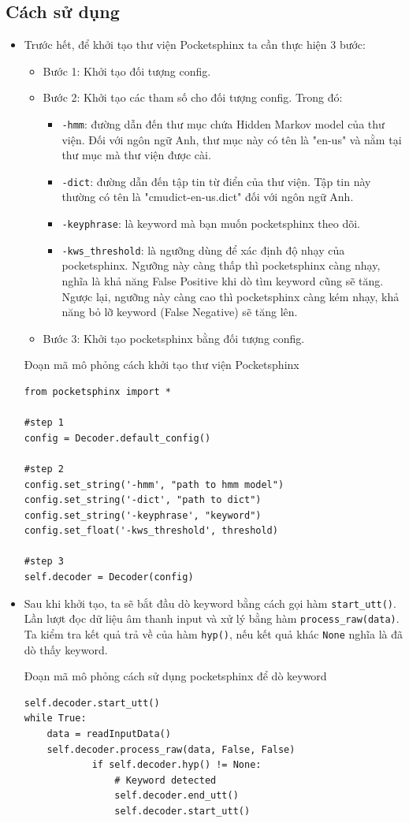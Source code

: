 \subsection{Cách sử dụng}
\begin{itemize}
\item Trước hết, để khởi tạo thư viện Pocketsphinx ta cần thực hiện 3 bước:
\begin{itemize}
\item Bước 1: Khởi tạo đối tượng config.
\item Bước 2: Khởi tạo các tham số cho đối tượng config. Trong đó:
\begin{itemize}
\item \lstinline{-hmm}: đường dẫn đến thư mục chứa Hidden Markov model của thư viện. Đối với ngôn ngữ Anh, thư mục này có tên là "en-us" và nằm tại thư mục mà thư viện được cài.
\item \lstinline{-dict}: đường dẫn đến tập tin từ điển của thư viện. Tập tin này thường có tên là "cmudict-en-us.dict" đối với ngôn ngữ Anh.
\item \lstinline{-keyphrase}: là keyword mà bạn muốn pocketsphinx theo dõi.
\item \lstinline{-kws_threshold}: là ngưỡng dùng để xác định độ nhạy của pocketsphinx. Ngưỡng này càng thấp thì pocketsphinx càng nhạy, nghĩa là khả năng False Positive khi dò tìm keyword cũng sẽ tăng. Ngược lại, ngưỡng này càng cao thì pocketsphinx càng kém nhạy, khả năng bỏ lỡ keyword (False Negative) sẽ tăng lên.
\end{itemize}
\item Bước 3: Khởi tạo pocketsphinx bằng đối tượng config.
\end{itemize}

Đoạn mã mô phỏng cách khởi tạo thư viện Pocketsphinx
\begin{lstlisting}
from pocketsphinx import *

#step 1
config = Decoder.default_config()

#step 2
config.set_string('-hmm', "path to hmm model")
config.set_string('-dict', "path to dict")
config.set_string('-keyphrase', "keyword")
config.set_float('-kws_threshold', threshold)

#step 3
self.decoder = Decoder(config)
\end{lstlisting}

\item Sau khi khởi tạo, ta sẽ bắt đầu dò keyword bằng cách gọi hàm \lstinline{start_utt()}. Lần lượt đọc dữ liệu âm thanh input và xử lý bằng hàm \lstinline{process_raw(data)}. Ta kiểm tra kết quả trả về của hàm \lstinline{hyp()}, nếu kết quả khác \lstinline{None} nghĩa là đã dò thấy keyword.

Đoạn mã mô phỏng cách sử dụng pocketsphinx để dò keyword
\begin{lstlisting}
self.decoder.start_utt()
while True:
	data = readInputData()
	self.decoder.process_raw(data, False, False)
			if self.decoder.hyp() != None:
				# Keyword detected
				self.decoder.end_utt()
				self.decoder.start_utt()
\end{lstlisting}
\end{itemize}
